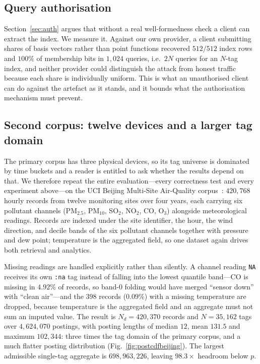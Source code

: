 \documentclass[journal]{IEEEtran}
\begin{document}
\subsection{Query authorisation}
\label{sec:authresult}
Section~\ref{sec:auth} argues that without a real well-formedness check a client
can extract the index. We measure it. Against our own provider, a client
submitting shares of basis vectors rather than point functions recovered
$512/512$ index rows and $100\%$ of membership bits in $1{,}024$ queries, i.e.\
$2N$ queries for an $N$-tag index, and neither provider could distinguish the
attack from honest traffic because each share is individually uniform. This is
what an unauthorised client can do against the artefact as it stands, and it
bounds what the authorisation mechanism must prevent.

\subsection{Second corpus: twelve devices and a larger tag domain}
\label{sec:secondcorpus}
The primary corpus has three physical devices, so its tag universe is dominated
by time buckets and a reader is entitled to ask whether the results depend on
that. We therefore repeat the entire evaluation---every correctness test and
every experiment above---on the UCI Beijing Multi-Site Air-Quality
corpus~\cite{zhang2017cautionary}: $420{,}768$ hourly records from twelve
monitoring sites over four years, each carrying six pollutant channels
(PM$_{2.5}$, PM$_{10}$, SO$_2$, NO$_2$, CO, O$_3$) alongside meteorological
readings. Records are indexed under the site identifier, the hour, the wind
direction, and decile bands of the six pollutant channels together with
pressure and dew point; temperature is the aggregated field, so one dataset
again drives both retrieval and analytics.

Missing readings are handled explicitly rather than silently. A channel reading
\texttt{NA} receives its own \texttt{:na} tag instead of falling into the lowest
quantile band---CO is missing in $4.92\%$ of records, so band-$0$ folding would
have merged ``sensor down'' with ``clean air''---and the $398$ records
($0.09\%$) with a missing temperature are dropped, because temperature is the
aggregated field and an aggregate must not sum an imputed value. The result is
$N_d=420{,}370$ records and $N=35{,}162$ tags over $4{,}624{,}070$ postings,
with posting lengths of median $12$, mean $131.5$ and maximum $102{,}344$:
three times the tag domain of the primary corpus, and a much flatter posting
distribution (Fig.~\ref{fig:postcdfbeijing}). The largest admissible single-tag
aggregate is $698{,}963{,}226$, leaving $98.3\times$ headroom below $p$.
\end{document}
